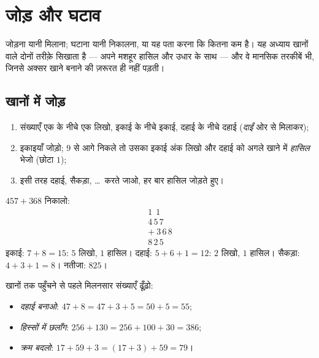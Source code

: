 \chapter{जोड़ और घटाव}\label{ch:g3:addsub}

जोड़ना यानी मिलाना; घटाना यानी निकालना, या यह पता करना कि कितना
कम है। यह अध्याय खानों वाले दोनों तरीक़े सिखाता है --- अपने
मशहूर हासिल और उधार के साथ --- और वे मानसिक तरकीबें भी, जिनसे
अक्सर खाने बनाने की ज़रूरत ही नहीं पड़ती।

\section{खानों में जोड़}

\begin{method}[खानों में जोड़ना]\label{met:g3:addsub:add}
\begin{enumerate}
  \item संख्याएँ एक के नीचे एक लिखो, इकाई के नीचे इकाई, दहाई
        के नीचे दहाई (\emph{दाईं} ओर से मिलाकर);
  \item इकाइयाँ जोड़ो;  $9$ से आगे निकले तो उसका इकाई अंक
        लिखो और दहाई को अगले खाने में \emph{हासिल} भेजो (छोटा $1$);
  \item इसी तरह दहाई, सैकड़ा, \dots\ करते जाओ, हर बार हासिल
        जोड़ते हुए।
\end{enumerate}
\end{method}

\begin{example}\label{ex:g3:addsub:add}
$457 + 368$ निकालो:
\[
\begin{array}{r}
{\scriptstyle 1}\ \ {\scriptstyle 1}\ \ \phantom{0} \\[-3pt]
4\,5\,7 \\
+\ 3\,6\,8 \\
\hline
8\,2\,5
\end{array}
\]
इकाई: $7 + 8 = 15$: $5$ लिखो, $1$ हासिल। दहाई:
$5 + 6 + 1 = 12$: $2$ लिखो, $1$ हासिल। सैकड़ा: $4 + 3 + 1 = 8$।
नतीजा: $825$।
\end{example}

\begin{example}[मन-ही-मन जोड़]\label{ex:g3:addsub:mental}
खानों तक पहुँचने से पहले मिलनसार संख्याएँ ढूँढ़ो:
\begin{itemize}
  \item \emph{दहाई बनाओ}: $47 + 8 = 47 + 3 + 5 = 50 + 5 = 55$;
  \item \emph{हिस्सों में छलाँग}: $256 + 130 = 256 + 100 + 30 = 386$;
  \item \emph{क्रम बदलो}: $17 + 59 + 3 = (17 + 3) + 59 = 79$।
\end{itemize}
\end{example}

